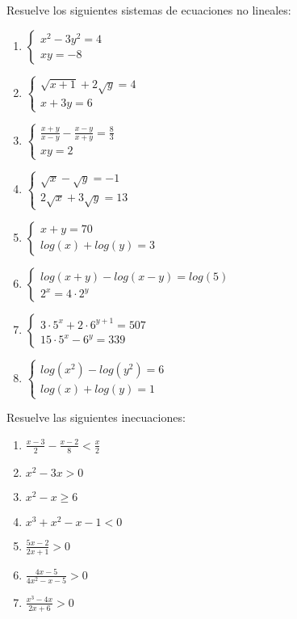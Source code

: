 \Exercicio Resuelve los siguientes sistemas de ecuaciones no lineales:

\begin{enumerate}[topsep=0pt]
	\item $ \begin{cases}
		x^2 - 3y^2 = 4 \\
		xy = -8
	\end{cases}  $
	\item $ \begin{cases}
		\sqrt{x+1} + 2\sqrt{y} = 4 \\
		x+3y=6
	\end{cases}  $
	\item $ \begin{cases}
		\frac{x+y}{x-y} -\frac{x-y}{x+y} = \frac{8}{3} \\
		xy = 2
	\end{cases}  $
	\item $ \begin{cases}
		\sqrt{x} - \sqrt{y} = -1 \\
		2\sqrt{x} + 3\sqrt{y} = 13
	\end{cases}  $
	\item $ \begin{cases}
		x+y = 70 \\
		log(x) + log(y) = 3
	\end{cases}  $
	\item $ \begin{cases}
		log(x+y) - log(x-y) = log(5) \\
		2^x = 4 \cdot 2^y
	\end{cases}  $
	\item $ \begin{cases}
		3 \cdot 5^x + 2 \cdot 6^{y+1} = 507\\
		15 \cdot 5^x - 6 ^y = 339
	\end{cases}  $
	\item $ \begin{cases}
		log(x^2) - log(y^2) = 6 \\
		log(x) + log(y) = 1
	\end{cases}  $
\end{enumerate}


\Exercicio Resuelve las siguientes inecuaciones:

\begin{enumerate}[topsep=0pt]
	\item $ \frac{x-3}{2} - \frac{x-2}{8} < \frac{x}{2} $
	\item $ x^2-3x > 0 $
	\item $ x^2 - x \ge 6 $
	\item $ x^3 +x^2 - x -1 < 0 $
	\item $ \frac{5x-2}{2x+1} > 0 $
	\item $ \frac{4x-5}{4x^2-x-5} > 0 $
	\item $ \frac{x^3-4x}{2x+6} > 0 $
\end{enumerate}



